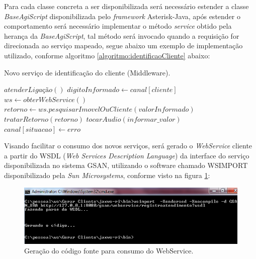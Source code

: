 Para cada classe concreta a ser disponibilizada será necessário estender a classe \textit{BaseAgiScript} disponibilizada pelo \textit{framework} Asterisk-Java, após estender o comportamento será necessário implementar o método \textit{service} obtido pela herança da \textit{BaseAgiScript}, tal método será invocado quando a requisição for direcionada ao serviço mapeado, segue abaixo um exemplo de implementação utilizado, conforme algoritmo \ref{algoritmo:identificaoCliente} abaixo:


\begin{algorithm}
	\caption{Novo serviço de identificação do cliente (Middleware).}	
	\label{algoritmo:identificaoCliente}
	\begin{algorithmic}[1]
		\STATE $atenderLigação()$ 		
		\STATE $digitoInformado \gets canal[cliente]$ 	
		\STATE $ws \gets obterWebService() $ 
		\STATE $retorno \gets ws.pesquisarImovelOuCliente(valorInformado) $
		\STATE $ tratarRetorno(retorno) $
		\ELSE		
		\STATE $ tocarAudio(informar\_valor) $
		\STATE $ canal[situacao] \leftarrow erro $
		\ENDIF		
	\end{algorithmic}
\end{algorithm}


Visando facilitar o consumo dos novos serviços, será gerado o \textit{WebService} cliente a partir do WSDL (\textit{Web Services Description Language}) da interface do serviço disponibilizada no sistema GSAN, utilizando o software chamado WSIMPORT disponibilizado pela \textit{Sun Microsystems}, conforme visto na figura \ref{figura:gerarWSCliente}:

\begin{figure}[H]
	\centering
	\caption{Geração do código fonte para consumo do WebService.}	
	\label{figura:gerarWSCliente}
	\includegraphics{figuras/gerar_wscliente.png}
\end{figure}


